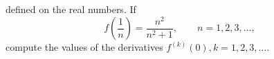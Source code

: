 defined on the real numbers. If
\[
f\left( \frac{1}{n} \right) = \frac{n^2}{n^2 + 1}, \qquad n = 1, 2, 3, \dots,
\]
compute the values of the derivatives $f^{(k)}(0), k = 1, 2, 3, \dots$.
